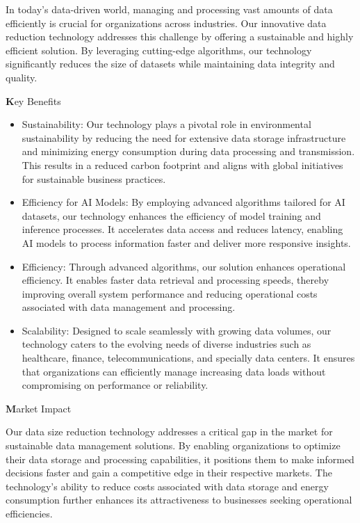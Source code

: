 In today's data-driven world, managing and processing vast amounts of data efficiently is crucial for organizations across industries. Our innovative data reduction technology addresses this challenge by offering a sustainable and highly efficient solution. By leveraging cutting-edge algorithms, our technology significantly reduces the size of datasets while maintaining data integrity and quality.

{\textbf Key Benefits}

\begin{itemize}
\item Sustainability: Our technology plays a pivotal role in environmental sustainability by reducing the need for extensive data storage infrastructure and minimizing energy consumption during data processing and transmission. This results in a reduced carbon footprint and aligns with global initiatives for sustainable business practices.

\item Efficiency for AI Models: By employing advanced algorithms tailored for AI datasets, our technology enhances the efficiency of model training and inference processes. It accelerates data access and reduces latency, enabling AI models to process information faster and deliver more responsive insights.

\item Efficiency: Through advanced algorithms, our solution enhances operational efficiency. It enables faster data retrieval and processing speeds, thereby improving overall system performance and reducing operational costs associated with data management and processing.

\item Scalability: Designed to scale seamlessly with growing data volumes, our technology caters to the evolving needs of diverse industries such as healthcare, finance, telecommunications, and specially data centers. It ensures that organizations can efficiently manage increasing data loads without compromising on performance or reliability.

\end{itemize}

{\textbf Market Impact}

Our data size reduction technology addresses a critical gap in the market for sustainable data management solutions. By enabling organizations to optimize their data storage and processing capabilities, it positions them to make informed decisions faster and gain a competitive edge in their respective markets. The technology's ability to reduce costs associated with data storage and energy consumption further enhances its attractiveness to businesses seeking operational efficiencies.

